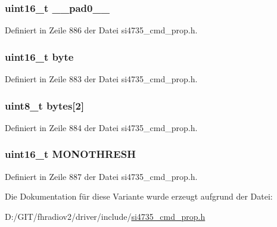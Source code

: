 \subsubsection[{\+\_\+\+\_\+pad0\+\_\+\+\_\+}]{\setlength{\rightskip}{0pt plus 5cm}uint16\+\_\+t \+\_\+\+\_\+pad0\+\_\+\+\_\+}\label{unionfm__blend__snr__mono__thres_a77132c2c26a75f5b8751b235cda23828}


Definiert in Zeile 886 der Datei si4735\+\_\+cmd\+\_\+prop.\+h.

\hypertarget{unionfm__blend__snr__mono__thres_ab0549c1b5ea980a02e7eab77e21fea49}{}
\subsubsection[{byte}]{\setlength{\rightskip}{0pt plus 5cm}uint16\+\_\+t byte}\label{unionfm__blend__snr__mono__thres_ab0549c1b5ea980a02e7eab77e21fea49}


Definiert in Zeile 883 der Datei si4735\+\_\+cmd\+\_\+prop.\+h.

\hypertarget{unionfm__blend__snr__mono__thres_a46e4c05d20a047ec169f60d3167e912e}{}
\subsubsection[{bytes}]{\setlength{\rightskip}{0pt plus 5cm}uint8\+\_\+t bytes\mbox{[}2\mbox{]}}\label{unionfm__blend__snr__mono__thres_a46e4c05d20a047ec169f60d3167e912e}


Definiert in Zeile 884 der Datei si4735\+\_\+cmd\+\_\+prop.\+h.

\hypertarget{unionfm__blend__snr__mono__thres_a5de7498b6512934529d0c6284f120805}{}
\subsubsection[{M\+O\+N\+O\+T\+H\+R\+E\+S\+H}]{\setlength{\rightskip}{0pt plus 5cm}uint16\+\_\+t M\+O\+N\+O\+T\+H\+R\+E\+S\+H}\label{unionfm__blend__snr__mono__thres_a5de7498b6512934529d0c6284f120805}


Definiert in Zeile 887 der Datei si4735\+\_\+cmd\+\_\+prop.\+h.



Die Dokumentation für diese Variante wurde erzeugt aufgrund der Datei\+:\begin{DoxyCompactItemize}
\item 
D\+:/\+G\+I\+T/fhradiov2/driver/include/\hyperlink{si4735__cmd__prop_8h}{si4735\+\_\+cmd\+\_\+prop.\+h}\end{DoxyCompactItemize}

